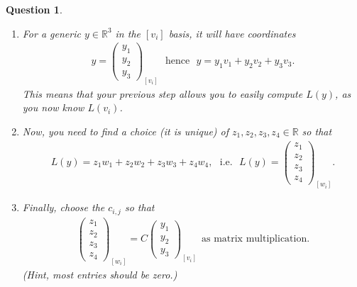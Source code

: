 \documentclass[12pt]{article}
\newtheorem{question}[thm]{Question}
\def\real{{\mathbb R}}
\newcommand{\ColVecThree}[3]{\begin{pmatrix} #1\\ #2\\ #3\end{pmatrix}}
\newcommand{\ColVecFour}[4]{\begin{pmatrix} #1\\ #2\\#3 \\ #4\end{pmatrix}}
\begin{document}
\begin{question}
\begin{enumerate}
		\item For a generic $y\in\real^3$ in the $[v_i]$ basis, it will have coordinates
		\begin{align*}
			y=\ColVecThree{y_1}{y_2}{y_3}_{[v_i]}\ \ \ \text{hence}\ \ \ 
			y=y_1 v_1 + y_2 v_2 + y_3 v_3.
		\end{align*}
		This means that your previous step allows you to easily compute $L(y)$, as you now know $L(v_i)$.
		
		\item Now, you need to find a choice (it is unique) of $z_1, z_2, z_3, z_4\in\real$ so that
		\begin{align*}
			L(y) = z_1 w_1 + z_2 w_2 + z_3 w_3 + z_4 w_4,\ \ \ \text{i.e.}\ \ \
			L(y) = \ColVecFour{z_1}{z_2}{z_3}{z_4}_{[w_i]}.
		\end{align*}
		
		\item Finally, choose the $c_{i,j}$ so that 
		\begin{align*}
			\ColVecFour{z_1}{z_2}{z_3}{z_4}_{[w_i]} = C\ColVecThree{y_1}{y_2}{y_3}_{[v_i]}\ \ \text{as matrix multiplication}.
		\end{align*}
		(Hint, most entries should be zero.)
	\end{enumerate}
	
	
	
\end{question}









\end{document}
